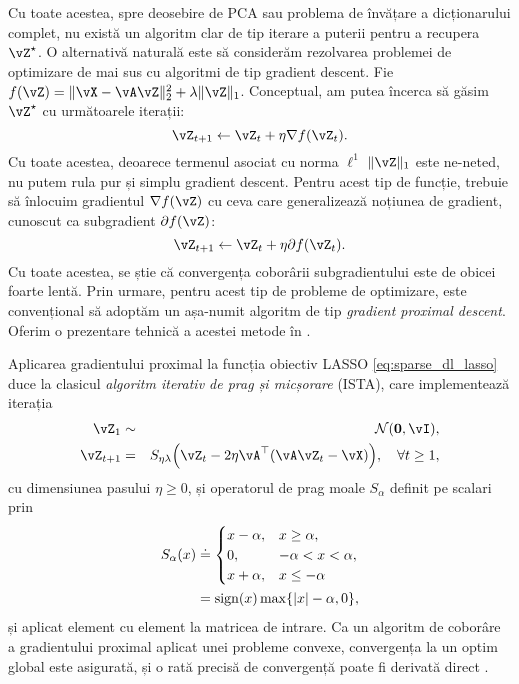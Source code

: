 \documentclass[../../book-main_ro.tex]{subfiles}
\begin{document}
Cu toate acestea, spre deosebire de PCA sau problema de
învățare a dicționarului complet, nu există un algoritm clar de tip iterare a puterii
pentru a recupera \(\vZ^{\star}\). O alternativă naturală este să considerăm
rezolvarea problemei de optimizare de mai sus cu algoritmi de tip gradient descent.
Fie \(f(\vZ) = \norm{\vX - \vA\vZ}_{2}^{2} + \lambda \norm{\vZ}_{1}\).
Conceptual, am putea încerca să găsim \(\vZ^{\star}\) cu următoarele iterații:
\begin{equation}
    \vZ_{t+1} \leftarrow \vZ_t + \eta \nabla f(\vZ_t).
\end{equation}
Cu toate acestea, deoarece termenul asociat cu norma \(\ell^1\) \(\norm{\vZ}_{1}\)
este ne-neted, nu putem rula pur și simplu gradient descent. Pentru acest tip de funcție,
trebuie să înlocuim gradientul \(\nabla f(\vZ)\) cu ceva care
generalizează noțiunea de gradient, cunoscut ca subgradient \(\partial
f(\vZ)\):
\begin{equation}
    \vZ_{t+1} \leftarrow \vZ_t + \eta \partial f(\vZ_t).
\end{equation}
Cu toate acestea, se știe că convergența coborârii subgradientului este de obicei foarte
lentă. Prin urmare, pentru acest tip de probleme de optimizare, este convențional să adoptăm
un așa-numit algoritm de tip {\em gradient proximal descent}. Oferim o prezentare tehnică
a acestei metode în .

Aplicarea gradientului proximal la funcția obiectiv LASSO
\eqref{eq:sparse_dl_lasso} duce la clasicul \textit{algoritm iterativ
de prag și micșorare} (ISTA), care implementează iterația
\begin{eqnarray}
    \vZ_{1} &\sim& \dNorm(\vzero, \vI), \\
    \vZ_{t + 1} &=& S_{\eta\lambda}\rp{\vZ_{t} - 2\eta \vA^{\top}(\vA\vZ_{t} - \vX)}, \quad \forall t \geq 1,\label{eq:ista_update}
\end{eqnarray}
cu dimensiunea pasului \(\eta \geq 0\), și operatorul de prag moale \(S_{\alpha}\) definit pe scalari prin
\begin{align}
    S_{\alpha}(x) &
    \doteq \begin{cases}x - \alpha, & x \geq \alpha, \\ 0,
    & -\alpha < x < \alpha, \\ x + \alpha, & x \leq -\alpha\end{cases}
    \\
    &=
    \sign(x) \max \set{\abs{x} - \alpha, 0},
\end{align}
și aplicat element cu element la matricea de intrare. Ca un algoritm de coborâre a gradientului
proximal aplicat unei probleme convexe, convergența la un optim global este
asigurată, și o rată precisă de convergență poate fi derivată direct
\cite{Wright-Ma-2022}. 
\end{document}
